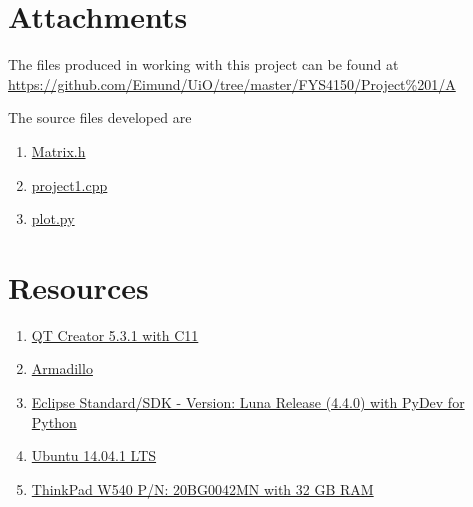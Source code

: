 \documentclass[11pt,english,a4paper]{article}
\begin{document}
\begin{flushleft}
\section{Attachments}

The files produced in working with this project can be found at \href{https://github.com/Eimund/UiO/tree/master/FYS4150/Project\%201/A}{https://github.com/Eimund/UiO/tree/master/FYS4150/Project\%201/A} \linebreak

The source files developed are

\begin{enumerate}
\item{\href{https://github.com/Eimund/UiO/blob/master/FYS4150/Project\%201/A/project1/Matrix.h}{Matrix.h}}
\item{\href{https://github.com/Eimund/UiO/blob/master/FYS4150/Project\%201/A/project1/project1.cpp}{project1.cpp}}
\item{\href{https://github.com/Eimund/UiO/blob/master/FYS4150/Project\%201/A/plot.py}{plot.py}}
\end{enumerate}

\section{Resources}

\begin{enumerate}
\item{\href{http://qt-project.org/downloads}{QT Creator 5.3.1 with C11}}
\item{\href{http://arma.sourceforge.net/}{Armadillo}}
\item{\href{https://www.eclipse.org/downloads/}{Eclipse Standard/SDK  - Version: Luna Release (4.4.0) with PyDev for Python}}
\item{\href{http://www.ubuntu.com/download/desktop}{Ubuntu 14.04.1 LTS}}
\item{\href{http://shop.lenovo.com/no/en/laptops/thinkpad/w-series/w540/#tab-reseller}{ThinkPad W540 P/N: 20BG0042MN with 32 GB RAM}}
\end{enumerate}


\end{flushleft}
\end{document}
